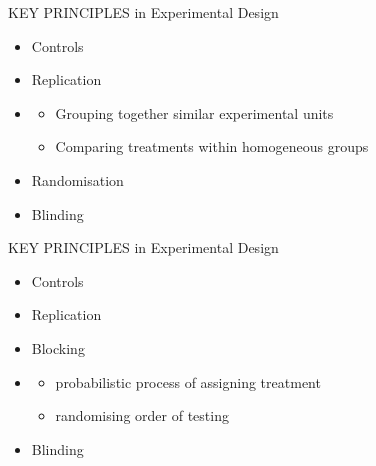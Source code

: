 \documentclass[10pt]{beamer}
\begin{document}
\begin{frame}{KEY PRINCIPLES in Experimental Design}

\begin{alertblock}{}
 \begin{itemize}
  \item Controls
  \item Replication
  \item {\color{red}{Blocking}}
    \begin{itemize}
     \item Grouping together similar experimental units
     \item Comparing treatments within homogeneous groups
    \end{itemize}
  \item Randomisation
  \item Blinding
 \end{itemize}

\end{alertblock}

\end{frame}


\begin{frame}{KEY PRINCIPLES in Experimental Design}

\begin{alertblock}{}
 \begin{itemize}
  \item Controls
  \item Replication
  \item Blocking
  \item {\color{red}{Randomisation}}
    \begin{itemize}
     \item probabilistic process of assigning treatment
     \item randomising order of testing
    \end{itemize}
  \item Blinding
 \end{itemize}

\end{alertblock}

\end{frame}
\end{document}

